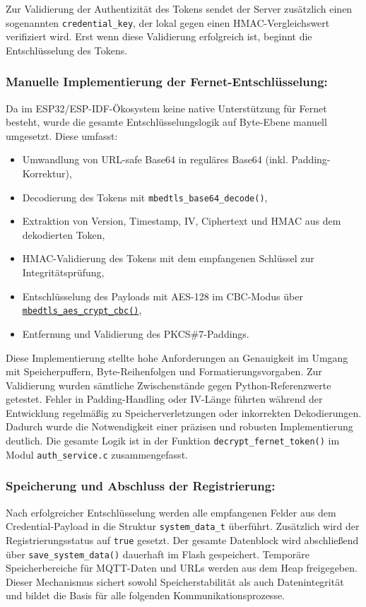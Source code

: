 \noindent Zur Validierung der Authentizität des Tokens sendet der Server zusätzlich einen sogenannten \texttt{credential\_key}, der lokal gegen einen HMAC-Vergleichswert verifiziert wird. Erst wenn diese Validierung erfolgreich ist, beginnt die Entschlüsselung des Tokens.

\subsubsection{Manuelle Implementierung der Fernet-Entschlüsselung:}  
Da im ESP32/ESP-IDF-Ökosystem keine native Unterstützung für Fernet besteht, wurde die gesamte Entschlüsselungslogik auf Byte-Ebene manuell umgesetzt. Diese umfasst:
\begin{itemize}
	\item Umwandlung von URL-safe Base64 in reguläres Base64 (inkl. Padding-Korrektur),
	\item Decodierung des Tokens mit \texttt{mbedtls\_base64\_decode()},
	\item Extraktion von Version, Timestamp, IV, Ciphertext und HMAC aus dem dekodierten Token,
	\item HMAC-Validierung des Tokens mit dem empfangenen Schlüssel zur Integritätsprüfung,
	\item Entschlüsselung des Payloads mit AES-128 im CBC-Modus über \texttt{\url{mbedtls\_aes\_crypt\_cbc()}},
	\item Entfernung und Validierung des PKCS\#7-Paddings.
\end{itemize}

Diese Implementierung stellte hohe Anforderungen an Genauigkeit im Umgang mit Speicherpuffern, Byte-Reihenfolgen und Formatierungsvorgaben. Zur Validierung wurden sämtliche Zwischenstände gegen Python-Referenzwerte getestet. Fehler in Padding-Handling oder IV-Länge führten während der Entwicklung regelmäßig zu Speicherverletzungen oder inkorrekten Dekodierungen. Dadurch wurde die Notwendigkeit einer präzisen und robusten Implementierung deutlich. Die gesamte Logik ist in der Funktion \texttt{decrypt\_fernet\_token()} im Modul \texttt{auth\_service.c} zusammengefasst.

\subsubsection{Speicherung und Abschluss der Registrierung:}  
Nach erfolgreicher Entschlüsselung werden alle empfangenen Felder aus dem Credential-Payload in die Struktur \texttt{system\_data\_t} überführt. Zusätzlich wird der Registrierungsstatus auf \texttt{true} gesetzt. Der gesamte Datenblock wird abschließend über \texttt{save\_system\_data()} dauerhaft im Flash gespeichert. Temporäre Speicherbereiche für MQTT-Daten und URLs werden aus dem Heap freigegeben. Dieser Mechanismus sichert sowohl Speicherstabilität als auch Datenintegrität und bildet die Basis für alle folgenden Kommunikationsprozesse.

